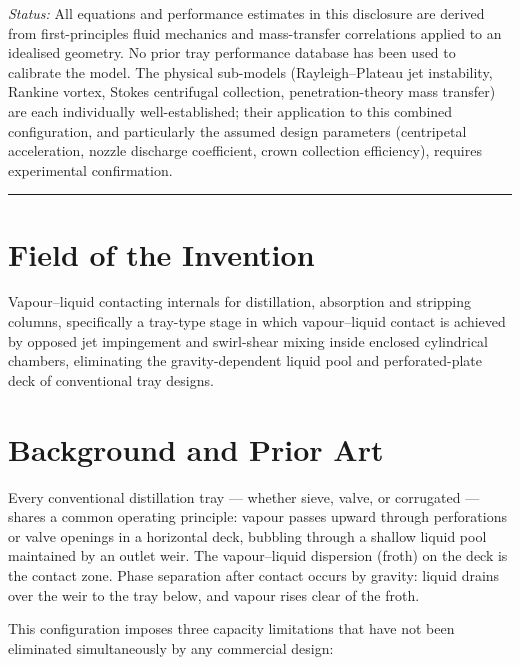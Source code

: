 \documentclass[11pt,letterpaper]{article}
\begin{document}
\noindent\textit{Status:} All equations and performance estimates in this
disclosure are derived from first-principles fluid mechanics and mass-transfer
correlations applied to an idealised geometry.  No prior tray performance
database has been used to calibrate the model.  The physical sub-models
(Rayleigh--Plateau jet instability, Rankine vortex, Stokes centrifugal
collection, penetration-theory mass transfer) are each individually
well-established; their application to this combined configuration, and
particularly the assumed design parameters (centripetal acceleration, nozzle
discharge coefficient, crown collection efficiency), requires experimental
confirmation.

\hrule\vspace{6pt}

\tableofcontents
\newpage

\section{Field of the Invention}

Vapour--liquid contacting internals for distillation, absorption and
stripping columns, specifically a tray-type stage in which vapour--liquid
contact is achieved by opposed jet impingement and swirl-shear mixing inside
enclosed cylindrical chambers, eliminating the gravity-dependent liquid pool
and perforated-plate deck of conventional tray designs.

\section{Background and Prior Art}

Every conventional distillation tray --- whether sieve, valve, or corrugated
--- shares a common operating principle: vapour passes upward through
perforations or valve openings in a horizontal deck, bubbling through a
shallow liquid pool maintained by an outlet weir.  The vapour--liquid
dispersion (froth) on the deck is the contact zone.  Phase separation after
contact occurs by gravity: liquid drains over the weir to the tray below,
and vapour rises clear of the froth.

This configuration imposes three capacity limitations that have not been
eliminated simultaneously by any commercial design:
\end{document}
